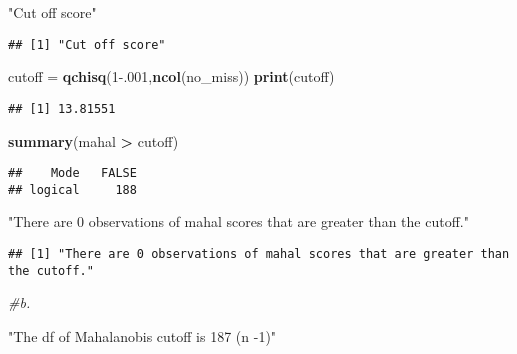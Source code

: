 \documentclass[
]{article}
\newenvironment{Shaded}{\begin{snugshade}}{\end{snugshade}}
\newcommand{\CommentTok}[1]{\textcolor[rgb]{0.56,0.35,0.01}{\textit{#1}}}
\newcommand{\DecValTok}[1]{\textcolor[rgb]{0.00,0.00,0.81}{#1}}
\newcommand{\FloatTok}[1]{\textcolor[rgb]{0.00,0.00,0.81}{#1}}
\newcommand{\KeywordTok}[1]{\textcolor[rgb]{0.13,0.29,0.53}{\textbf{#1}}}
\newcommand{\NormalTok}[1]{#1}
\newcommand{\OperatorTok}[1]{\textcolor[rgb]{0.81,0.36,0.00}{\textbf{#1}}}
\newcommand{\StringTok}[1]{\textcolor[rgb]{0.31,0.60,0.02}{#1}}
\begin{document}
\begin{Shaded}
\begin{Highlighting}[]
\StringTok{"Cut off score"}
\end{Highlighting}
\end{Shaded}

\begin{verbatim}
## [1] "Cut off score"
\end{verbatim}

\begin{Shaded}
\begin{Highlighting}[]
\NormalTok{cutoff =}\StringTok{ }\KeywordTok{qchisq}\NormalTok{(}\DecValTok{1}\FloatTok{-.001}\NormalTok{,}\KeywordTok{ncol}\NormalTok{(no_miss))}
\KeywordTok{print}\NormalTok{(cutoff)}
\end{Highlighting}
\end{Shaded}

\begin{verbatim}
## [1] 13.81551
\end{verbatim}

\begin{Shaded}
\begin{Highlighting}[]
\KeywordTok{summary}\NormalTok{(mahal }\OperatorTok{>}\StringTok{ }\NormalTok{cutoff)}
\end{Highlighting}
\end{Shaded}

\begin{verbatim}
##    Mode   FALSE 
## logical     188
\end{verbatim}

\begin{Shaded}
\begin{Highlighting}[]
\StringTok{"There are 0 observations of mahal scores that are greater than the cutoff."}
\end{Highlighting}
\end{Shaded}

\begin{verbatim}
## [1] "There are 0 observations of mahal scores that are greater than the cutoff."
\end{verbatim}

\begin{Shaded}
\begin{Highlighting}[]
\CommentTok{#b.}

\StringTok{"The df of Mahalanobis cutoff is 187 (n -1)"}
\end{Highlighting}
\end{Shaded}
\end{document}
